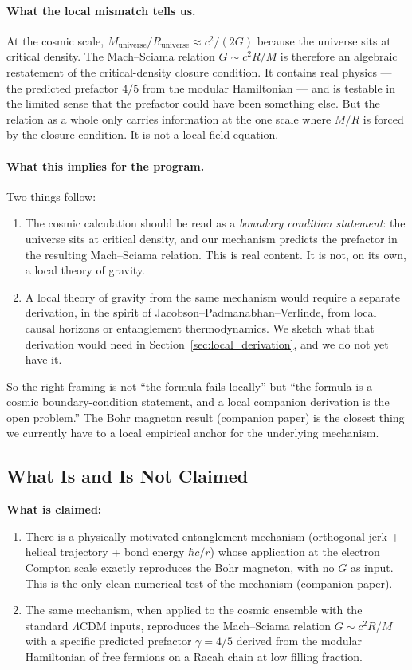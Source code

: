 \documentclass[11pt,letterpaper]{article}
\newcommand{\Runiv}{R_{\mathrm{universe}}}
\newcommand{\Muniv}{M_{\mathrm{universe}}}
\begin{document}
\paragraph{What the local mismatch tells us.}
At the cosmic scale, $\Muniv/\Runiv \approx c^2/(2 G)$ because the
universe sits at critical density. The Mach--Sciama relation
$G \sim c^2 R/M$ is therefore an algebraic restatement of the
critical-density closure condition. It contains real physics --- the
predicted prefactor $4/5$ from the modular Hamiltonian --- and is
testable in the limited sense that the prefactor could have been
something else. But the relation as a whole only carries information
at the one scale where $M/R$ is forced by the closure condition. It
is not a local field equation.

\paragraph{What this implies for the program.}
Two things follow:
\begin{enumerate}
  \item The cosmic calculation should be read as a \emph{boundary
    condition statement}: the universe sits at critical density,
    and our mechanism predicts the prefactor in the resulting
    Mach--Sciama relation. This is real content. It is not, on its
    own, a local theory of gravity.
  \item A local theory of gravity from the same mechanism would
    require a separate derivation, in the spirit of
    Jacobson--Padmanabhan--Verlinde, from local causal horizons or
    entanglement thermodynamics. We sketch what that derivation
    would need in Section~\ref{sec:local_derivation}, and we do not
    yet have it.
\end{enumerate}

So the right framing is not ``the formula fails locally'' but ``the
formula is a cosmic boundary-condition statement, and a local
companion derivation is the open problem.'' The Bohr magneton
result (companion paper) is the closest thing we currently have to
a local empirical anchor for the underlying mechanism.

\subsection{What Is and Is Not Claimed}

\textbf{What is claimed:}
\begin{enumerate}
  \item There is a physically motivated entanglement mechanism
    (orthogonal jerk + helical trajectory + bond energy $\hbar c/r$)
    whose application at the electron Compton scale exactly
    reproduces the Bohr magneton, with no $G$ as input. This is the
    only clean numerical test of the mechanism (companion paper).
  \item The same mechanism, when applied to the cosmic ensemble with
    the standard $\Lambda$CDM inputs, reproduces the Mach--Sciama
    relation $G \sim c^2 R/M$ with a specific predicted prefactor
    $\gamma = 4/5$ derived from the modular Hamiltonian of free
    fermions on a Racah chain at low filling fraction.
\end{enumerate}
\end{document}
